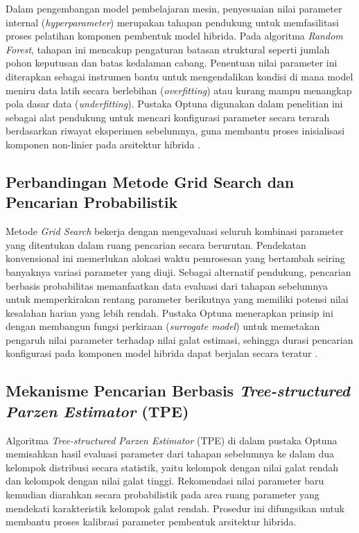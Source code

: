 Dalam pengembangan model pembelajaran mesin, penyesuaian nilai parameter internal (\textit{hyperparameter}) merupakan tahapan pendukung untuk memfasilitasi proses pelatihan komponen pembentuk model hibrida. Pada algoritma \textit{Random Forest}, tahapan ini mencakup pengaturan batasan struktural seperti jumlah pohon keputusan dan batas kedalaman cabang. Penentuan nilai parameter ini diterapkan sebagai instrumen bantu untuk mengendalikan kondisi di mana model meniru data latih secara berlebihan (\textit{overfitting}) atau kurang mampu menangkap pola dasar data (\textit{underfitting}). Pustaka Optuna digunakan dalam penelitian ini sebagai alat pendukung untuk mencari konfigurasi parameter secara terarah berdasarkan riwayat eksperimen sebelumnya, guna membantu proses inisialisasi komponen non-linier pada arsitektur hibrida \autocite{kostadinov2024forecasting}.

\subsection{Perbandingan Metode Grid Search dan Pencarian Probabilistik}

Metode \textit{Grid Search} bekerja dengan mengevaluasi seluruh kombinasi parameter yang ditentukan dalam ruang pencarian secara berurutan. Pendekatan konvensional ini memerlukan alokasi waktu pemrosesan yang bertambah seiring banyaknya variasi parameter yang diuji. Sebagai alternatif pendukung, pencarian berbasis probabilitas memanfaatkan data evaluasi dari tahapan sebelumnya untuk memperkirakan rentang parameter berikutnya yang memiliki potensi nilai kesalahan harian yang lebih rendah. Pustaka Optuna menerapkan prinsip ini dengan membangun fungsi perkiraan (\textit{surrogate model}) untuk memetakan pengaruh nilai parameter terhadap nilai galat estimasi, sehingga durasi pencarian konfigurasi pada komponen model hibrida dapat berjalan secara teratur \autocite{kostadinov2024forecasting}.

\newpage

\subsection{Mekanisme Pencarian Berbasis \textit{Tree-structured Parzen Estimator} (TPE)}

Algoritma \textit{Tree-structured Parzen Estimator} (TPE) di dalam pustaka Optuna memisahkan hasil evaluasi parameter dari tahapan sebelumnya ke dalam dua kelompok distribusi secara statistik, yaitu kelompok dengan nilai galat rendah dan kelompok dengan nilai galat tinggi. Rekomendasi nilai parameter baru kemudian diarahkan secara probabilistik pada area ruang parameter yang mendekati karakteristik kelompok galat rendah. Prosedur ini difungsikan untuk membantu proses kalibrasi parameter pembentuk arsitektur hibrida.


